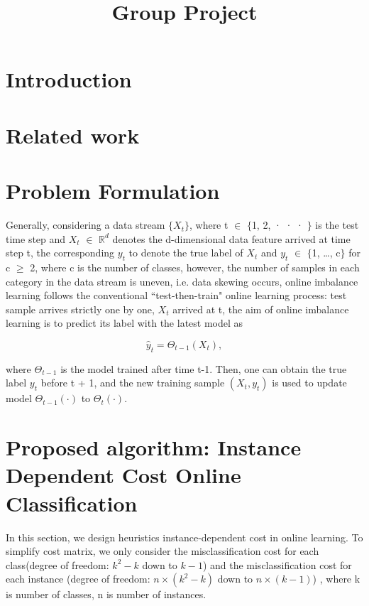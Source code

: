 \documentclass{article}
\title{Group Project}
\author{}
\begin{document}
\maketitle

\begin{abstract}

\end{abstract}

\section{Introduction}

\section{Related work}

\section{Problem Formulation}
Generally, considering a data stream $\{X_t\}$, where t $\in$ $\{$1, 2, · · · $\}$ is the test time step and $X_t$ $\in$ $\mathbb{R}^d$ denotes the d-dimensional data feature arrived at time step t, the corresponding $y_t$ to denote the true label of $X_t$ and $y_t$ $\in$ $\{$1, \dots, c$\}$ for c $\geq$ 2, where c is the number of classes, however, the number of samples in each category in the data stream is uneven, i.e. data skewing occurs, online imbalance learning follows the conventional “test-then-train" online learning process: test sample arrives strictly one by one, $X_t$ arrived at t, the aim of online imbalance learning is to predict its label with the latest model as 

$$\hat{y}_t =\Theta_{t-1}(X_t),$$ 

where $\Theta_{t-1}$ is the model trained after time t-1. Then, one can obtain the true label $y_t$ before t + 1, and the new training sample $(X_t, y_t)$ is used to update model $\Theta_{t-1}(\cdot)$  to $\Theta_{t}(\cdot)$. 

\section{Proposed algorithm: Instance Dependent Cost Online Classification}

In this section, we design heuristics instance-dependent cost in online learning. To simplify cost matrix, we only consider the misclassification cost for each class(degree of freedom: $k^2-k$ down to $k-1$) and the misclassification cost for each instance (degree of freedom: $n\times(k^2-k)$ down to $n\times(k-1)$) , where k is number of classes, n is number of instances. 
\end{document}
